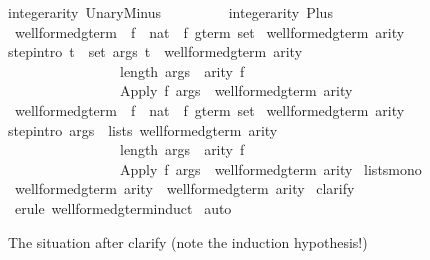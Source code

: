 \begin{isabellebody}
{\isachardoublequote}integer{\isacharunderscore}arity\ UnaryMinus\ \ \ \ \ \ \ \ {\isacharequal}\ {\isacharhash}{}{\isachardoublequote}\isanewline
{\isachardoublequote}integer{\isacharunderscore}arity\ Plus\ \ \ \ \ \ \ \ \ \ \ \ \ \ {\isacharequal}\ {\isacharhash}{}{\isachardoublequote}\isanewline
\isanewline
{}\ well{\isacharunderscore}formed{\isacharunderscore}gterm\ {\isacharcolon}{\isacharcolon}\ {\isachardoublequote}{\isacharparenleft}{\isacharprime}f\ {\isasymRightarrow}\ nat{\isacharparenright}\ {\isasymRightarrow}\ {\isacharprime}f\ gterm\ set{\isachardoublequote}\isanewline
{}\ {\isachardoublequote}well{\isacharunderscore}formed{\isacharunderscore}gterm\ arity{\isachardoublequote}\isanewline
{}\isanewline
step{\isacharbrackleft}intro{\isacharbang}{\isacharbrackright}{\isacharcolon}\ {\isachardoublequote}{\isasymlbrakk}{\isasymforall}t\ {\isasymin}\ set\ args{\isachardot}\ t\ {\isasymin}\ well{\isacharunderscore}formed{\isacharunderscore}gterm\ arity{\isacharsemicolon}\ \ \isanewline
\ \ \ \ \ \ \ \ \ \ \ \ \ \ \ \ length\ args\ {\isacharequal}\ arity\ f{\isasymrbrakk}\isanewline
\ \ \ \ \ \ \ \ \ \ \ \ \ \ \ {\isasymLongrightarrow}\ {\isacharparenleft}Apply\ f\ args{\isacharparenright}\ {\isasymin}\ well{\isacharunderscore}formed{\isacharunderscore}gterm\ arity{\isachardoublequote}\isanewline
\isanewline
\isanewline
{}\ well{\isacharunderscore}formed{\isacharunderscore}gterm{\isacharprime}\ {\isacharcolon}{\isacharcolon}\ {\isachardoublequote}{\isacharparenleft}{\isacharprime}f\ {\isasymRightarrow}\ nat{\isacharparenright}\ {\isasymRightarrow}\ {\isacharprime}f\ gterm\ set{\isachardoublequote}\isanewline
{}\ {\isachardoublequote}well{\isacharunderscore}formed{\isacharunderscore}gterm{\isacharprime}\ arity{\isachardoublequote}\isanewline
{}\isanewline
step{\isacharbrackleft}intro{\isacharbang}{\isacharbrackright}{\isacharcolon}\ {\isachardoublequote}{\isasymlbrakk}args\ {\isasymin}\ lists\ {\isacharparenleft}well{\isacharunderscore}formed{\isacharunderscore}gterm{\isacharprime}\ arity{\isacharparenright}{\isacharsemicolon}\ \ \isanewline
\ \ \ \ \ \ \ \ \ \ \ \ \ \ \ \ length\ args\ {\isacharequal}\ arity\ f{\isasymrbrakk}\isanewline
\ \ \ \ \ \ \ \ \ \ \ \ \ \ \ {\isasymLongrightarrow}\ {\isacharparenleft}Apply\ f\ args{\isacharparenright}\ {\isasymin}\ well{\isacharunderscore}formed{\isacharunderscore}gterm{\isacharprime}\ arity{\isachardoublequote}\isanewline
{}\ lists{\isacharunderscore}mono\isanewline
\isanewline
{}\ {\isachardoublequote}well{\isacharunderscore}formed{\isacharunderscore}gterm\ arity\ {\isasymsubseteq}\ well{\isacharunderscore}formed{\isacharunderscore}gterm{\isacharprime}\ arity{\isachardoublequote}\isanewline
{}\ clarify\isanewline
{}\ {\isacharparenleft}erule\ well{\isacharunderscore}formed{\isacharunderscore}gterm{\isachardot}induct{\isacharparenright}\isanewline
{}\ auto\isanewline
{}%
\begin{isamarkuptext}%
The situation after clarify (note the induction hypothesis!)


\end{isamarkuptext}
\end{isabellebody}
